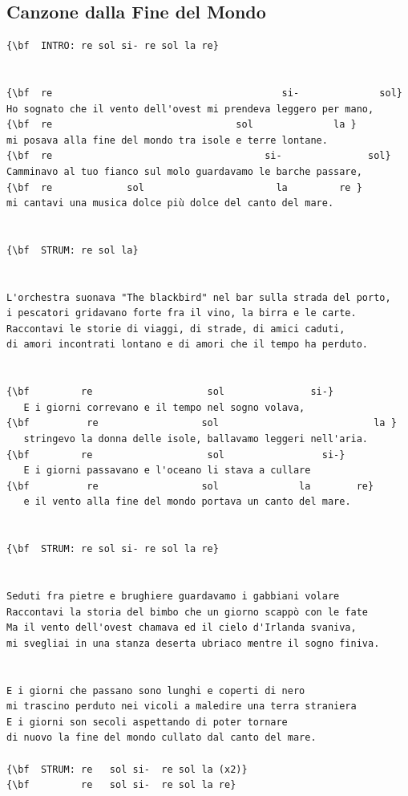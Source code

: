 \documentclass[a4paper]{article}
\begin{document}
\subsection{Canzone dalla Fine del Mondo}
\begin{Verbatim}[commandchars=\\\{\}]
{\bf  INTRO: re sol si- re sol la re}


{\bf  re                                        si-              sol}
Ho sognato che il vento dell'ovest mi prendeva leggero per mano,
{\bf  re                                sol              la }
mi posava alla fine del mondo tra isole e terre lontane.
{\bf  re                                     si-               sol}
Camminavo al tuo fianco sul molo guardavamo le barche passare,
{\bf  re             sol                       la         re }
mi cantavi una musica dolce più dolce del canto del mare. 


{\bf  STRUM: re sol la}


L'orchestra suonava "The blackbird" nel bar sulla strada del porto, 
i pescatori gridavano forte fra il vino, la birra e le carte. 
Raccontavi le storie di viaggi, di strade, di amici caduti, 
di amori incontrati lontano e di amori che il tempo ha perduto. 


{\bf         re                    sol               si-}
   E i giorni correvano e il tempo nel sogno volava,
{\bf          re                  sol                           la }
   stringevo la donna delle isole, ballavamo leggeri nell'aria. 
{\bf         re                    sol                 si-}
   E i giorni passavano e l'oceano li stava a cullare
{\bf          re                  sol              la        re}
   e il vento alla fine del mondo portava un canto del mare. 


{\bf  STRUM: re sol si- re sol la re}


Seduti fra pietre e brughiere guardavamo i gabbiani volare 
Raccontavi la storia del bimbo che un giorno scappò con le fate 
Ma il vento dell'ovest chamava ed il cielo d'Irlanda svaniva, 
mi svegliai in una stanza deserta ubriaco mentre il sogno finiva. 


E i giorni che passano sono lunghi e coperti di nero 
mi trascino perduto nei vicoli a maledire una terra straniera 
E i giorni son secoli aspettando di poter tornare 
di nuovo la fine del mondo cullato dal canto del mare.

{\bf  STRUM: re   sol si-  re sol la (x2)}
{\bf         re   sol si-  re sol la re}

\end{Verbatim}
\newpage
\end{document}
